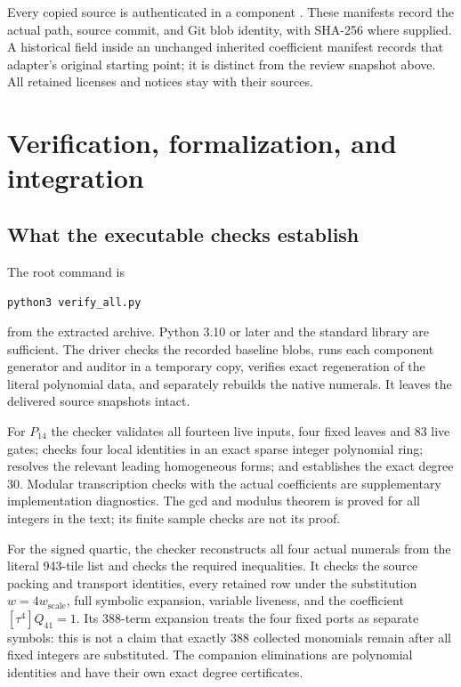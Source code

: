 \documentclass[11pt,a4paper]{article}
\theoremstyle{definition}
\theoremstyle{remark}
\begin{document}
Every copied source is authenticated in a component
.  These manifests record the actual path, source
commit, and Git blob identity, with SHA-256 where supplied.  A historical
 field inside an unchanged inherited coefficient
manifest records that adapter's original starting point; it is distinct
from the review snapshot above.  All retained licenses and notices stay
with their sources.

\section{Verification, formalization, and integration}
\label{sec:verification}

\subsection{What the executable checks establish}

The root command is
\begin{center}\texttt{python3 verify\_all.py}\end{center}
from the extracted archive.  Python 3.10 or later and the standard library
are sufficient.  The driver checks the recorded baseline blobs, runs each
component generator and auditor in a temporary copy, verifies exact
regeneration of the literal polynomial data, and separately rebuilds the
native numerals.  It leaves the delivered source snapshots intact.

For $P_{14}$ the checker validates all fourteen live inputs, four fixed
leaves and 83 live gates; checks four local identities in an exact sparse
integer polynomial ring; resolves the relevant leading homogeneous forms;
and establishes the exact degree 30.  Modular transcription checks with the
actual coefficients are supplementary implementation diagnostics.  The gcd
and modulus theorem is proved for all integers in the text; its finite
sample checks are not its proof.

For the signed quartic, the checker reconstructs all four actual numerals
from the literal 943-tile list and checks the required inequalities.  It
checks the source packing and transport identities, every retained row
under the substitution $w=4w_{\mathrm{scale}}$, full symbolic expansion,
variable liveness, and the coefficient $[\tau^4]Q_{41}=1$.  Its 388-term
expansion treats the four fixed ports as separate symbols: this is not a
claim that exactly 388 collected monomials remain after all fixed integers
are substituted.  The companion eliminations are polynomial identities and
have their own exact degree certificates.
\end{document}
